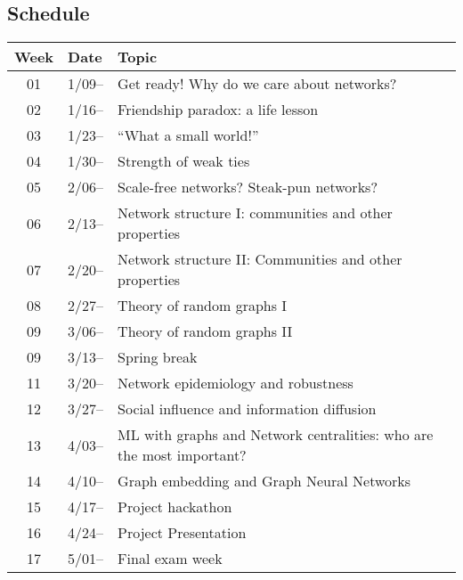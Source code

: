 \subsection{Schedule}\label{sub:schedule}%

\begin{tabular}{@{}cll@{}} \toprule
  Week & Date & Topic \\\midrule
  01 & 1/09-- & Get ready! Why do we care about networks? \\
  02 & 1/16-- & Friendship paradox: a life lesson \\
  03 & 1/23-- & ``What a small world!'' \\
  04 & 1/30-- & Strength of weak ties \\
  05 & 2/06-- & Scale-free networks? Steak-pun networks? \\
  06 & 2/13-- & Network structure I: communities and other properties  \\
  07 & 2/20-- & Network structure II: Communities and other properties  \\
  08 & 2/27-- & Theory of random graphs I \\
  09 & 3/06-- & Theory of random graphs II \\
  09 & 3/13-- & Spring break \\
  11 & 3/20-- & Network epidemiology and robustness \\
  12 & 3/27-- & Social influence and information diffusion \\
  13 & 4/03-- & ML with graphs and Network centralities: who are the most important? \\
  14 & 4/10-- & Graph embedding and Graph Neural Networks \\
  15 & 4/17-- & Project hackathon \\
  16 & 4/24-- & Project Presentation \\
  17 & 5/01-- & Final exam week \\
  \bottomrule
\end{tabular}


